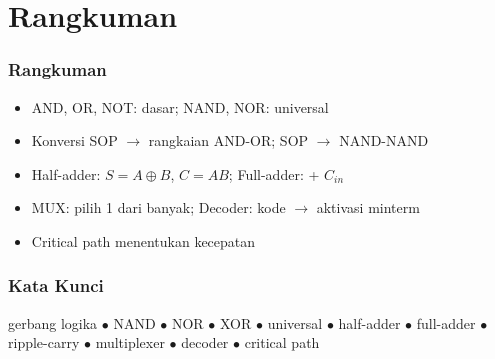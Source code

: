 \documentclass[handout]{beamer}
\theoremstyle{definition}
\theoremstyle{example}
\begin{document}
\section{Rangkuman}

\begin{frame}
\frametitle{Rangkuman}
\begin{itemize}
  \item AND, OR, NOT: dasar; NAND, NOR: universal
  \item Konversi SOP $\rightarrow$ rangkaian AND-OR; SOP $\rightarrow$ NAND-NAND
  \item Half-adder: $S=A\oplus B$, $C=AB$; Full-adder: + $C_{in}$
  \item MUX: pilih 1 dari banyak; Decoder: kode $\rightarrow$ aktivasi minterm
  \item Critical path menentukan kecepatan
\end{itemize}
\end{frame}

\begin{frame}
\frametitle{Kata Kunci}
\begin{center}
\small
gerbang logika $\bullet$ NAND $\bullet$ NOR $\bullet$ XOR $\bullet$ universal $\bullet$ half-adder $\bullet$ full-adder $\bullet$ ripple-carry $\bullet$ multiplexer $\bullet$ decoder $\bullet$ critical path
\end{center}
\end{frame}
\end{document}
